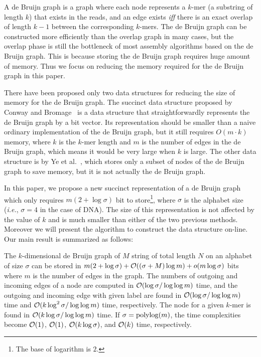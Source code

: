 A de Bruijn graph is a graph where each node represents a $k$-mer
(a substring of length $k$)
that exists in the reads, and an edge exists {\it iff} there is an 
exact overlap of length $k-1$ between the corresponding $k$-mers. 
The de Bruijn graph can be constructed more efficiently than the overlap graph 
in many cases, 
but the overlap phase is still the bottleneck of most assembly algorithms based 
on the de Bruijn graph. 
This is because storing the de Bruijn graph requires huge amount of memory. 
Thus we focus on reducing the memory required for the de Bruijn graph in this paper. 

There have been proposed only two data structures for
reducing the size of memory for the de Bruijn graph.
The succinct data structure proposed by Conway and Bromage~\cite{conway}
is a data structure that straightforwardly
represents the de Bruijn graph by a bit vector.
Its representation should be smaller than a naive ordinary implementation of
the de Bruijn graph, but it still requires $O(m\cdot k)$ memory,
where $k$ is the $k$-mer length and $m$ is the number of edges in the de Bruijn graph,
which means it would be very large when $k$ is large.
The other data structure is by Ye et al.~\cite{YeMa12}, which
stores only a subset of nodes of the de Bruijn graph to save memory,
but it is not actually the de Bruijn graph.

In this paper, we propose a new succinct representation of a de Bruijn graph
which only requires $m(2+\log \sigma)$ bit to store\footnote{The base of logarithm is $2$.}, where
$\sigma$ is the alphabet size ({\it i.e.}, $\sigma = 4$ in the case of DNA).
The size of this representation is not affected by the value of $k$ and is
much smaller than either of the two previous methods.
Moreover we will present the algorithm to construct the data structure on-line.
Our main result is summarized as follows:
\begin{theorem}
The $k$-dimensional de Bruijn graph of $M$ string of total length $N$ on an alphabet of size $\sigma$
can be stored in $m(2+\log \sigma) + \mathcal{O}((\sigma+M) \log m) + o(m \log\sigma)$
bits where $m$ is the number of edges in the graph.  
The numbers of outgoing and incoming edges of a node are computed in $\mathcal{O}(\log\sigma/\log\log m)$ time,
and the outgoing and incoming edge with given label are found in $\mathcal{O}(\log\sigma/\log\log m)$ time
and $\mathcal{O}(k\log^2\sigma/\log\log m)$ time, respectively.
The node for a given $k$-mer is found in $\mathcal{O}(k\log\sigma/\log\log m)$ time.
If $\sigma = {\mathop{\mathrm{polylog}}\nolimits}(m)$, the time complexities become $\mathcal{O}(1)$, $\mathcal{O}(1)$, $\mathcal{O}(k\log\sigma)$,
and $\mathcal{O}(k)$ time, respectively.
\end{theorem}

